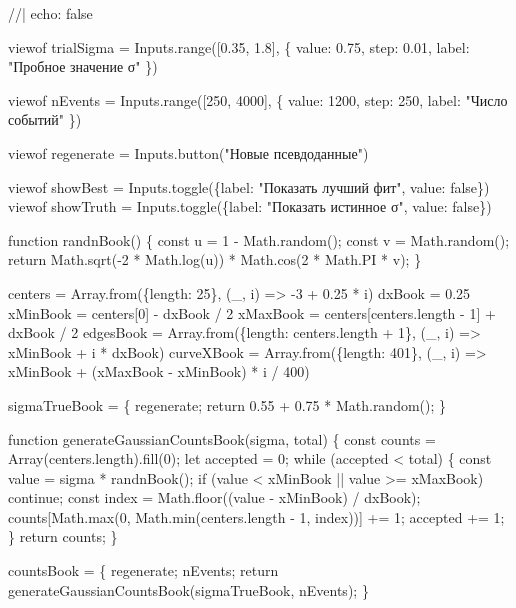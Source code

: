 \documentclass[
  russian,
  letterpaper,
]{scrbook}
\newenvironment{Shaded}{\begin{snugshade}}{\end{snugshade}}
\newcommand{\NormalTok}[1]{\textcolor[rgb]{0.00,0.23,0.31}{#1}}
\begin{document}
\begin{Shaded}
\begin{Highlighting}[]
\NormalTok{//| echo: false}

\NormalTok{viewof trialSigma = Inputs.range([0.35, 1.8], \{}
\NormalTok{  value: 0.75,}
\NormalTok{  step: 0.01,}
\NormalTok{  label: "Пробное значение σ"}
\NormalTok{\})}

\NormalTok{viewof nEvents = Inputs.range([250, 4000], \{}
\NormalTok{  value: 1200,}
\NormalTok{  step: 250,}
\NormalTok{  label: "Число событий"}
\NormalTok{\})}

\NormalTok{viewof regenerate = Inputs.button("Новые псевдоданные")}

\NormalTok{viewof showBest = Inputs.toggle(\{label: "Показать лучший фит", value: false\})}
\NormalTok{viewof showTruth = Inputs.toggle(\{label: "Показать истинное σ", value: false\})}

\NormalTok{function randnBook() \{}
\NormalTok{  const u = 1 {-} Math.random();}
\NormalTok{  const v = Math.random();}
\NormalTok{  return Math.sqrt({-}2 * Math.log(u)) * Math.cos(2 * Math.PI * v);}
\NormalTok{\}}

\NormalTok{centers = Array.from(\{length: 25\}, (\_, i) =\textgreater{} {-}3 + 0.25 * i)}
\NormalTok{dxBook = 0.25}
\NormalTok{xMinBook = centers[0] {-} dxBook / 2}
\NormalTok{xMaxBook = centers[centers.length {-} 1] + dxBook / 2}
\NormalTok{edgesBook = Array.from(\{length: centers.length + 1\}, (\_, i) =\textgreater{} xMinBook + i * dxBook)}
\NormalTok{curveXBook = Array.from(\{length: 401\}, (\_, i) =\textgreater{} xMinBook + (xMaxBook {-} xMinBook) * i / 400)}

\NormalTok{sigmaTrueBook = \{}
\NormalTok{  regenerate;}
\NormalTok{  return 0.55 + 0.75 * Math.random();}
\NormalTok{\}}

\NormalTok{function generateGaussianCountsBook(sigma, total) \{}
\NormalTok{  const counts = Array(centers.length).fill(0);}
\NormalTok{  let accepted = 0;}
\NormalTok{  while (accepted \textless{} total) \{}
\NormalTok{    const value = sigma * randnBook();}
\NormalTok{    if (value \textless{} xMinBook || value \textgreater{}= xMaxBook) continue;}
\NormalTok{    const index = Math.floor((value {-} xMinBook) / dxBook);}
\NormalTok{    counts[Math.max(0, Math.min(centers.length {-} 1, index))] += 1;}
\NormalTok{    accepted += 1;}
\NormalTok{  \}}
\NormalTok{  return counts;}
\NormalTok{\}}

\NormalTok{countsBook = \{}
\NormalTok{  regenerate;}
\NormalTok{  nEvents;}
\NormalTok{  return generateGaussianCountsBook(sigmaTrueBook, nEvents);}
\NormalTok{\}}


\end{Highlighting}
\end{Shaded}
\end{document}
